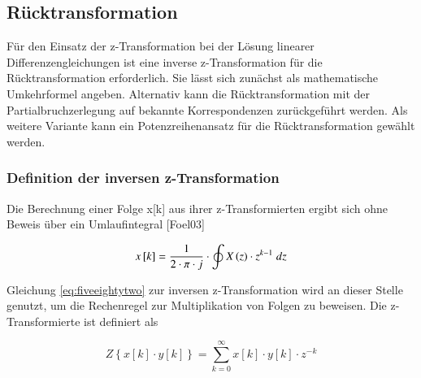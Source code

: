 \begin{table}[H]
{\begin{tabular}{| c | c | c | c |}
\parbox[c][0.5in][c]{0.3in}{} &
\parbox[c][0.5in][c]{2.4in}{} & 
\parbox[c][0.5in][c]{1.2in}{} & 
\parbox[c][0.5in][c]{2.4in}{}\\
\hline

\end{tabular}%
}
\label{tab:fivefive}
\end{table}

\clearpage

\subsection{R\"{u}cktransformation}

\noindent F\"{u}r den Einsatz der z-Transformation bei der L\"{o}sung linearer Differenzengleichungen ist eine inverse z-Transformation f\"{u}r die R\"{u}cktransformation erforderlich. Sie l\"{a}sst sich zun\"{a}chst als mathematische Umkehrformel angeben. Alternativ kann die R\"{u}cktransformation mit der Partialbruchzerlegung auf bekannte Korrespondenzen zur\"{u}ckgef\"{u}hrt werden. Als weitere Variante kann ein Potenzreihenansatz f\"{u}r die R\"{u}cktransformation gew\"{a}hlt werden.

\subsubsection{Definition der inversen z-Transformation}

\noindent Die Berechnung einer Folge x[k] aus ihrer z-Transformierten ergibt sich ohne Beweis \"{u}ber ein Umlaufintegral [Foel03]

\begin{equation}\label{eq:fiveeightytwo}
x\left[k\right]=\frac{1}{2\cdot \pi \cdot j} \cdot \oint X\left(z\right)\cdot z^{k-1} {\rm \; }dz 
\end{equation}

\noindent Gleichung \eqref{eq:fiveeightytwo} zur inversen z-Transformation wird an dieser Stelle genutzt, um die Rechenregel zur Multiplikation von Folgen zu beweisen. Die z-Transformierte ist definiert als

\begin{equation}\label{eq:fiveeightythree}
Z\left\{x\left[k\right]\cdot y\left[k\right]\right\}=\sum _{k=0}^{\infty }x\left[k\right]\cdot y\left[k\right]\cdot z^{-k}
\end{equation}

